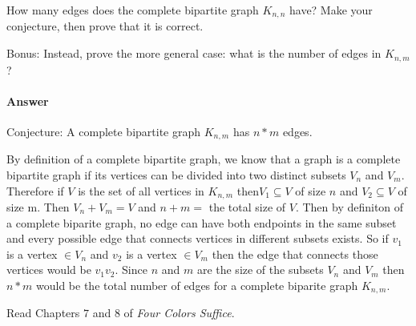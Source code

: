 \documentclass{article}
\begin{document}
How many edges does the complete bipartite graph $K_{n,n}$ have?  Make your
conjecture, then prove that it is correct.

Bonus: Instead, prove the more general case:
what is the number of edges in $K_{n,m}$?

\paragraph{Answer}

Conjecture: A complete bipartite graph $K_{n,m}$ has $n*m$ edges. 

By definition of a complete bipartite graph, we know that a graph is a complete bipartite graph if its vertices can be divided into two distinct subsets $V_n$ and $V_m$. Therefore if $V$ is the set of all vertices in $K_{n,m}$ then$V_1 \subseteq V$ of size $n$ and $V_2 \subseteq V$ of size {m}. Then $V_n+V_m=V$ and $n+m=$ the total size of $V$. Then by definiton of a complete biparite graph, no edge can have both endpoints in the same subset and every possible edge that connects vertices in different subsets exists. So if $v_1$ is a vertex $\in V_n$ and $v_2$ is a vertex $\in V_m$ then the edge that connects those vertices would be $v_1v_2$. Since $n$ and $m$ are the size of the subsets $V_n$ and $V_m$ then $n*m$ would be the total number of edges for a complete biparite graph $K_{n,m}$.





 

Read Chapters $7$ and $8$ of \emph{Four Colors Suffice}.
\end{document}
